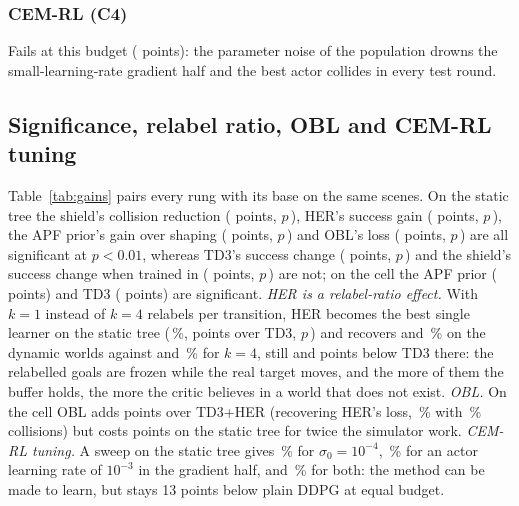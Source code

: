 \documentclass[conference]{IEEEtran}
\begin{document}
\subsubsection{CEM-RL (C4)}
Fails at this budget (\gSstaticcemrl{} points): the parameter noise of the population drowns the small-learning-rate gradient half and the best actor collides in every test round.





\subsection{Significance, relabel ratio, OBL and CEM-RL tuning}\label{sec:sig}
Table~\ref{tab:gains} pairs every rung with its base on the same scenes. On the static tree the shield's collision reduction (\pCstaticshieldevalcmvspaperddpg{} points, $p$\,\pPCstaticshieldevalcmvspaperddpg{}), HER's success gain (\pSstatictdhervstd{} points, $p$\,\pPstatictdhervstd{}), the APF prior's gain over shaping (\pSstatictdherapfvstdherapfshape{} points, $p$\,\pPstatictdherapfvstdherapfshape{}) and OBL's loss (\pSstatictdheroblvstdher{} points, $p$\,\pPstatictdheroblvstdher{}) are all significant at $p<0.01$, whereas TD3's success change (\pSstatictdvspaperddpg{} points, $p$\,\pPstatictdvspaperddpg{}) and the shield's success change when trained in (\pSstatictdherapfshieldvstdherapf{} points, $p$\,\pPstatictdherapfshieldvstdherapf{}) are not; on the cell the APF prior (\pSuretdherapfvstdherapfshape{} points) and TD3 (\pSuretdvspaperddpg{} points) are significant. \emph{HER is a relabel-ratio effect.} With $k=1$ instead of $k=4$ relabels per transition, HER becomes the best single learner on the static tree (\Sstaticherk{}\,\%, \pSstaticherkvstd{} points over TD3, $p$\,\pPstaticherkvstd{}) and recovers \Swindherk{} and \Sureherk{}\,\% on the dynamic worlds against \Swindtdher{} and \Suretdher{}\,\% for $k=4$, still \pSwindherkvstd{} and \pSureherkvstd{} points below TD3 there: the relabelled goals are frozen while the real target moves, and the more of them the buffer holds, the more the critic believes in a world that does not exist. \emph{OBL.} On the cell OBL adds \pSuretdheroblvstdher{} points over TD3+HER (recovering HER's loss, \Suretdherobl{}\,\% with \Curetdherobl{}\,\% collisions) but costs \pSstatictdheroblvstdher{} points on the static tree for twice the simulator work. \emph{CEM-RL tuning.} A sweep on the static tree gives \Sstaticcems{}\,\% for $\sigma_0=10^{-4}$, \Sstaticcemlr{}\,\% for an actor learning rate of $10^{-3}$ in the gradient half, and \Sstaticcemslr{}\,\% for both: the method can be made to learn, but stays 13 points below plain DDPG at equal budget.
\end{document}
